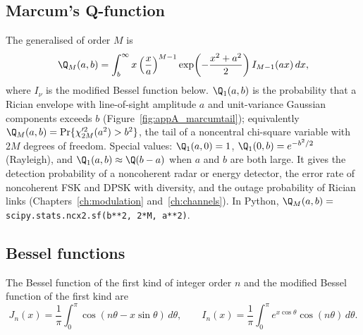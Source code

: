 \subsection{Marcum's Q-function}

The generalised  of order $M$ is
\begin{equation}
\Q_M(a,b)=\int_b^\infty x\left(\frac xa\right)^{M-1}\exp\!\left(-\frac{x^2+a^2}{2}\right)I_{M-1}(ax)\,dx,
\label{eq:appA:marcum}
\end{equation}
where $I_\nu$ is the modified Bessel function below. $\Q_1(a,b)$ is the probability that a
Rician envelope with line-of-sight amplitude $a$ and unit-variance Gaussian components exceeds
$b$ (Figure~\ref{fig:appA_marcumtail}); equivalently $\Q_M(a,b)=\Pr\{\chi'^2_{2M}(a^2)>b^2\}$, the
tail of a noncentral chi-square variable with $2M$ degrees of freedom. Special values:
$\Q_1(a,0)=1$, $\Q_1(0,b)=e^{-b^2/2}$ (Rayleigh), and $\Q_1(a,b)\approx\Q(b-a)$ when $a$ and $b$
are both large. It gives the detection probability of a noncoherent radar or energy detector,
the error rate of noncoherent FSK and DPSK with diversity, and the outage probability of Rician
links (Chapters~\ref{ch:modulation} and~\ref{ch:channels}). In Python,
$\Q_M(a,b)=$ \texttt{scipy.stats.ncx2.sf(b**2, 2*M, a**2)}.


\subsection{Bessel functions}

The Bessel function of the first kind of integer order $n$ and the modified Bessel function
of the first kind are
\begin{equation}
J_n(x)=\frac1\pi\int_0^\pi\cos(n\theta-x\sin\theta)\,d\theta,\qquad
I_n(x)=\frac1\pi\int_0^\pi e^{x\cos\theta}\cos(n\theta)\,d\theta.
\label{eq:appA:bessel}
\end{equation}


